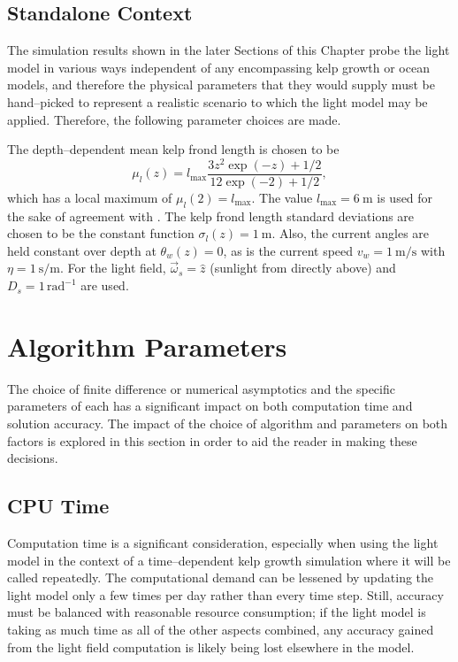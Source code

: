 \subsection{Standalone Context}
\label{sec:standalone_context}
The simulation results shown in the later Sections of this Chapter probe the light model in various ways independent of any encompassing kelp growth or ocean models, and therefore the physical parameters that they would supply must be hand--picked to represent a realistic scenario to which the light model may be applied.
Therefore, the following parameter choices are made.

The depth--dependent mean kelp frond length is chosen to be
\begin{equation}
    \mu_l(z) = l_{\max}\frac{3z^2 \exp(-z) + 1/2}{12\exp(-2) + 1/2},
\end{equation}
which has a local maximum of $\mu_l(2)=l_{\max}$.
The value $l_{\max}=\SI{6}{\m}$ is used for the sake of agreement with \cite{norvik_design_2017}.
The kelp frond length standard deviations are chosen to be the constant function $\sigma_l(z) = \SI{1}{\m}$.
Also, the current angles are held constant over depth at $\theta_w(z)=0$, as is the current speed $v_w=\SI{1}{\m\per\s}$ with $\eta=\SI{1}{\s\per\m}$.
For the light field, $\vec{\omega}_s=\hat{z}$ (sunlight from directly above) and $D_s=1\, \mbox{rad}^{-1}$ are used.

\section{Algorithm Parameters}
The choice of finite difference or numerical asymptotics and the specific parameters of each has a significant impact on both computation time and solution accuracy.
The impact of the choice of algorithm and parameters on both factors is explored in this section in order to aid the reader in making these decisions.

\subsection{CPU Time}
Computation time is a significant consideration, especially when using the light model in the context of a time--dependent kelp growth simulation where it will be called repeatedly.
The computational demand can be lessened by updating the light model only a few times per day rather than every time step.
Still, accuracy must be balanced with reasonable resource consumption; if the light model is taking as much time as all of the other aspects combined, any accuracy gained from the light field computation is likely being lost elsewhere in the model.

